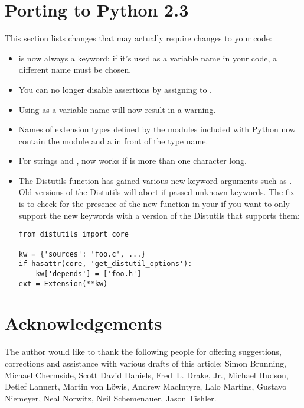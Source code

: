 \documentclass{howto}
\begin{document}
\section{Porting to Python 2.3}

This section lists changes that may actually require changes to your code:

\begin{itemize}

\item {} is now always a keyword; if it's used as a
variable name in your code, a different name must be chosen.

\item You can no longer disable assertions by assigning to .

\item Using  as a variable name will now result in a
 warning.

\item Names of extension types defined by the modules included with
Python now contain the module and a  in front of the type
name.

\item For strings  and ,  now works
if  is more than one character long.

\item The Distutils  function has gained various new
keyword arguments such as .  Old versions of the
Distutils will abort if passed unknown keywords.  The fix is to check
for the presence of the new  function
in your  if you want to only support the new keywords
with a version of the Distutils that supports them:

\begin{verbatim}
from distutils import core

kw = {'sources': 'foo.c', ...}
if hasattr(core, 'get_distutil_options'):
    kw['depends'] = ['foo.h']
ext = Extension(**kw)
\end{verbatim}

\end{itemize}


\section{Acknowledgements \label{acks}}

The author would like to thank the following people for offering
suggestions, corrections and assistance with various drafts of this
article: Simon Brunning, Michael Chermside, Scott David Daniels, Fred~L. Drake, Jr.,
Michael Hudson, Detlef Lannert, Martin von L\"owis, Andrew MacIntyre,
Lalo Martins, Gustavo Niemeyer, Neal Norwitz, Neil Schemenauer, Jason
Tishler.
\end{document}
